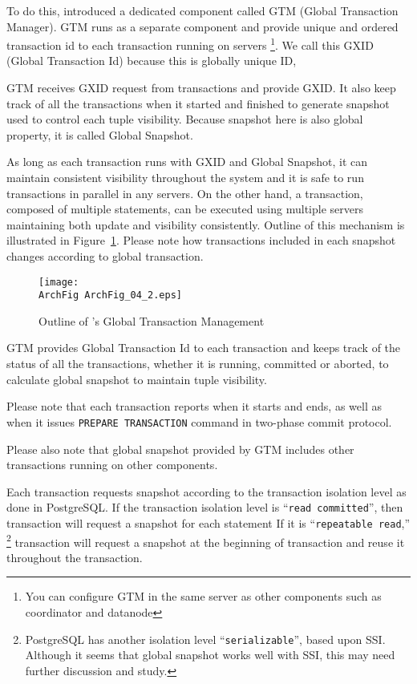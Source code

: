   To do this, \XC{} introduced a dedicated component called GTM (Global Transaction Manager).
  GTM runs as a separate component and provide unique and ordered transaction id to each transaction
  running on \XC{} servers%
  \footnote{
	  You can configure GTM in the same server as other components such as coordinator and datanode
  }.
  We call this GXID (Global Transaction Id) because this is globally unique ID,
  
  GTM receives GXID request from transactions and provide GXID.
  It also keep track of all the transactions when it started and finished to generate snapshot
  used to control each tuple visibility.
  Because snapshot here is also global property, it is called Global Snapshot.
  
  As long as each transaction runs with GXID and Global Snapshot,
  it can maintain consistent visibility throughout the system and it is safe to run transactions
  in parallel in any servers.
  On the other hand, a transaction, composed of multiple statements, can be executed
  using multiple servers maintaining both update and visibility consistently.
  Outline of this mechanism is illustrated in Figure~\ref{archfig:8}.
  Please note how transactions included in each snapshot changes according to global transaction.
  
  \begin{figure}[htp]
	  \begin{center}
		  \texttt{[image: \\ArchFig ArchFig\_04\_2.eps]}
		  \caption{\label{archfig:8}Outline of \XC's Global Transaction Management}
	  \end{center}
  \end{figure}
  
  GTM provides Global Transaction Id to each transaction and keeps track of the status of
  all the transactions, whether it is running, committed or aborted, to calculate global
  snapshot to maintain tuple visibility.
  
  Please note that each transaction reports when it starts and ends, as well as when it
  issues \texttt{PREPARE TRANSACTION} command in two-phase commit protocol.
  
  Please also note that global snapshot provided by GTM includes other transactions running
  on other components.
  
  Each transaction requests snapshot according to the transaction isolation level as done
  in PostgreSQL.
  If the transaction isolation level is ``\texttt{read committed}'', then transaction will request
  a snapshot for each statement%
  If it is ``\texttt{repeatable read},''
  \footnote{PostgreSQL has another isolation level ``\texttt{serializable}'', based upon SSI.
	 		Although it seems that global snapshot works well with SSI, this may need further
	  		discussion and study.
  }
  transaction will request a snapshot at the beginning of transaction and reuse it
  throughout the transaction.
  
